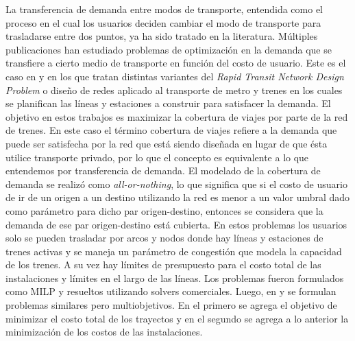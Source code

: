 \documentclass{article}
\begin{document}

  La transferencia de demanda entre modos de transporte, entendida como el proceso en el cual los usuarios deciden cambiar el modo de transporte para trasladarse entre dos puntos, ya ha sido tratado en la literatura. Múltiples publicaciones han estudiado problemas de optimización en la demanda que se transfiere a cierto medio de transporte en función del costo de usuario. Este es el caso en \cite{garcia2005} y \cite{laporte2007} en los que tratan distintas variantes del {\it Rapid Transit Network Design Problem} o diseño de redes aplicado al transporte de metro y trenes en los cuales se planifican las líneas y estaciones a construir para satisfacer la demanda. El objetivo en estos trabajos es maximizar la cobertura de viajes por parte de la red de trenes. En este caso el término cobertura de viajes refiere a la demanda que puede ser satisfecha por la red que está siendo diseñada en lugar de que ésta utilice transporte privado, por lo que el concepto es equivalente a lo que entendemos por transferencia de demanda. El modelado de la cobertura de demanda se realizó como {\it all-or-nothing}, lo que significa que si el costo de usuario de ir de un origen a un destino utilizando la red es menor a un valor umbral dado como parámetro para dicho par origen-destino, entonces se considera que la demanda de ese par origen-destino está cubierta. En estos problemas los usuarios solo se pueden trasladar por arcos y nodos donde hay líneas y estaciones de trenes activas y se maneja un parámetro de congestión que modela la capacidad de los trenes. A su vez hay límites de presupuesto para el costo total de las instalaciones y límites en el largo de las líneas. Los problemas fueron formulados como MILP y resueltos utilizando solvers comerciales. Luego, en \cite{marin2007} y \cite{cadarso2015} se formulan problemas similares pero multiobjetivos. En el primero se agrega el objetivo de minimizar el costo total de los trayectos y en el segundo se agrega a lo anterior la minimización de los costos de las instalaciones.
\end{document}
